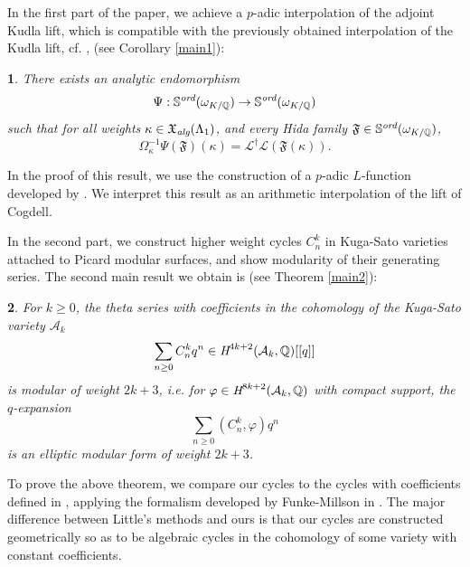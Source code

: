 \documentclass[12pt,a4paper,reqno]{amsart}
\theoremstyle{definition}
\numberwithin{definition}{subsection}
\theoremstyle{definition}
\numberwithin{Definition}{subsection}
\theoremstyle{remark}
\theoremstyle{remark}
\numberwithin{Remark}{subsection}
\theoremstyle{remark}
\theoremstyle{plain}
\numberwithin{Theorem}{subsection}
\theoremstyle{plain}
\newcommand{\thistheoremname}{}
\newtheorem*{genericthm}{\thistheoremname}
\newenvironment{namedthm}[1]
  {\renewcommand{\thistheoremname}{#1}%
   \begin{genericthm}}
  {\end{genericthm}}
\theoremstyle{plain}
\theoremstyle{plain}
\theoremstyle{plain}
\theoremstyle{plain}
\theoremstyle{plain}
\theoremstyle{plain}
\newcommand*{\Q}{\mathbb{Q}}
\newcommand*{\s}{\mathbb{S}}
\begin{document}
In the first part of the paper, we achieve a $p$-adic interpolation of the adjoint Kudla lift, which is compatible with the previously obtained interpolation of the Kudla lift, cf. \cite[Theorem 17]{iudica}, (see Corollary \ref{main1}):

\begin{namedthm}{Main Theorem A}
There exists an analytic endomorphism 
\[
\Psi:\s^{\emph{ord}}(\omega_{K/\Q})\to \s^{\emph{ord}}(\omega_{K/\Q})
\] 
such that for all weights $\kappa\in \mathfrak{X}_{\emph{alg}}(\Lambda_1)$, and every Hida family $\mathfrak{F}\in \s^{\emph{ord}}(\omega_{K/\Q})$,
\[
\Omega_\kappa^{-1} \Psi(\mathfrak{F})(\kappa)=\mathcal{L}^\dagger\mathcal{L}(\mathfrak{F}(\kappa)).
\]
\end{namedthm}
\noindent In the proof of this result, we use the construction of a $p$-adic $L$-function developed by \cite{eischen}.
We interpret this result as an arithmetic interpolation of the lift of Cogdell.

In the second part, we construct higher weight cycles $C_n^k$ in Kuga-Sato varieties attached to Picard modular surfaces, and show modularity of their generating series. The second main result we obtain is (see Theorem \ref{main2}):

\begin{namedthm}{Main Theorem B}
For $k\geq 0$, the theta series with coefficients in the cohomology of the Kuga-Sato variety $\mathcal{A}_k$
\[
\sum_{n\geq 0}C_n^k q^n\in \emph{H}^{4k+2}(\mathcal{A}_k,\Q)[[q]]
\]
is modular of weight $2k+3$, i.e. for $\varphi\in \emph{H}^{8k+2}(\mathcal{A}_k,\Q)$ with compact support, the $q$-expansion
\[
\sum_{n\geq 0}(C_n^k, \varphi) q^n
\]
is an elliptic modular form of weight $2k+3$.
\end{namedthm}
\noindent To prove the above theorem, we compare our cycles to the cycles with coefficients defined in \cite{little}, applying the formalism developed by Funke-Millson in \cite{funke}.
The major difference between Little's methods and ours is that our cycles are constructed geometrically so as to be algebraic cycles in the cohomology of some variety with constant coefficients.
\end{document}
